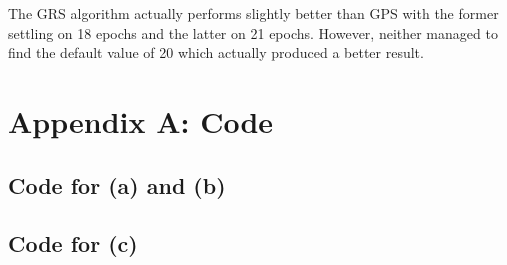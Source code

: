 \documentclass[12pt]{article}
\begin{document}
The GRS algorithm actually performs slightly better than GPS with the former settling on 18 epochs and the latter on 21 epochs. However, neither managed to find the default value of 20 which actually produced a better result.

\newpage

\section*{Appendix A: Code}

\subsection*{Code for (a) and (b)}

\lstset{basicstyle=\footnotesize,xleftmargin=0in}


\subsection*{Code for (c)}

\lstset{basicstyle=\footnotesize,xleftmargin=0in}

\end{document}
